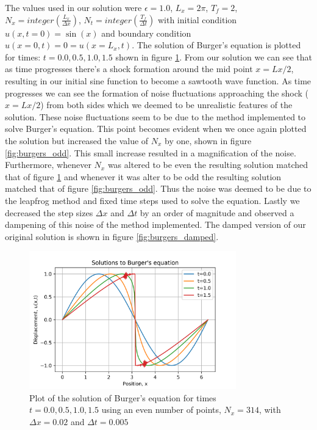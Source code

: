 \documentclass{article}
\begin{document}
The values used in our solution were $\epsilon = 1.0$, $L_x = 2 \pi $, $T_f = 2$, $N_x = integer(\frac{L_x}{\Delta x})$, $N_t = integer(\frac{T_f}{\Delta t})$ with initial condition $u(x, t=0)=\sin(x)$ and boundary condition $u(x=0,t)=0=u(x=L_x,t)$.
The solution of Burger's equation is plotted for times: $t=0.0,0.5,1.0,1.5$ shown in figure \ref{fig:burgers_even}.
From our solution we can see that as time progresses there's a shock formation around the mid point $x=Lx/2$, resulting in our initial sine function to become a sawtooth wave function. As time progresses we can see the formation of noise fluctuations approaching the shock ($x=Lx/2$) from both sides which we deemed to be unrealistic features of the solution. These noise fluctuations seem to be due to the method implemented to solve Burger's equation. This point becomes evident when we once again plotted the solution but increased the value of $N_x$ by one, shown in figure \ref{fig:burgers_odd}. This small increase resulted in a magnification of the noise. Furthermore, whenever $N_x$ was altered to be even the resulting solution matched that of figure \ref{fig:burgers_even} and whenever it was alter to be odd the resulting solution matched that of figure \ref{fig:burgers_odd}. Thus the noise was deemed to be due to the leapfrog method and fixed time steps used to solve the equation. Lastly we decreased the step sizes $\Delta x$ and $\Delta t$ by an order of magnitude and observed a dampening of this noise of the method implemented. The damped version of our original solution is shown in figure \ref{fig:burgers_damped}. 

\begin{figure}[H]
	\centering
	\includegraphics[width=0.8\textwidth]{../images/burgers.png}
	\caption{Plot of the solution of Burger's equation for times $t=0.0,0.5,1.0,1.5$ using an even number of points, $N_x=314$, with $\Delta x=0.02$ and $\Delta t=0.005$}
	\label{fig:burgers_even}
\end{figure}
\end{document}
